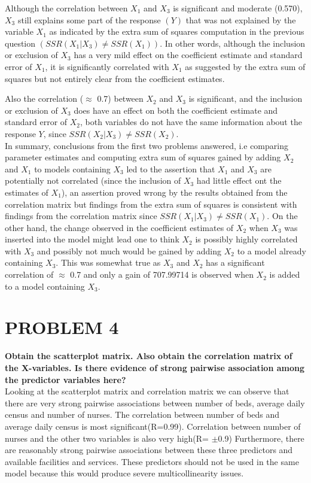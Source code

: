 \documentclass[a4paper,9pt]{article}\usepackage[]{graphicx}\usepackage[]{color}
\begin{document}
Although the correlation between $X_1$ and $X_3$ is significant and moderate (0.570), $X_3$ still explains some part of the response $(Y)$ that was not explained by the variable $X_1$ as indicated by the extra sum of squares computation in the previous question $(SSR(X_{1}|X_{3}) \neq SSR(X_{1}))$. In other words, although the inclusion or exclusion of $X_3$ has a very mild effect on the coefficient estimate and standard error of $X_1$, it is significantly correlated with $X_1$ as suggested by the extra sum of squares but not entirely clear from the coefficient estimates.

Also the correlation ($\approx$ 0.7) between $X_2$ and $X_3$ is significant, and the inclusion or exclusion of $X_3$ does have an effect on both the coefficient estimate and standard error of $X_2$, both variables do not have the same information about the response $Y$, since $SSR(X_{2}|X_{3}) \neq SSR(X_{2})$.\\

In summary, conclusions from the first two problems answered, i.e comparing parameter estimates and computing extra sum of squares gained by adding $X_2$ and $X_1$ to models containing $X_3$ led to the assertion that $X_1$ and $X_3$ are potentially not correlated (since the inclusion of $X_3$ had little effect ont the estimates of $X_1$), an assertion proved wrong by the results obtained from the correlation matrix but findings from the extra sum of squares is consistent with findings from the correlation matrix since $SSR(X_{1}|X_{3}) \neq SSR(X_{1})$. On the other hand, the change observed in the coefficient estimates of $X_2$ when $X_3$ was inserted into the model might lead one to think $X_2$ is possibly highly correlated with $X_3$ and possibly not much would be gained by adding $X_2$ to a model already containing $X_3$. This was somewhat true as $X_3$ and $X_2$ has a significant correlation of $\approx$ 0.7 and only a gain of 707.99714 is observed when $X_2$ is added to a model containing $X_3$.

\section*{PROBLEM 4}
\textbf{Obtain the scatterplot matrix. Also obtain the correlation matrix of the X-variables. Is there evidence of strong pairwise association among the predictor variables here?}\\

Looking at the scatterplot matrix and correlation matrix we can observe that there are very strong pairwise associations between number of beds, average daily census and number of nurses. The correlation between number of beds and average daily census is most significant(R=0.99). Correlation between number of nurses and the other two variables is also very high(R= $\pm$0.9) Furthermore, there are reasonably strong pairwise associations between these three predictors and available facilities and services. These predictors should not be used in the same model because this would produce severe multicollinearity issues.\\
\end{document}
